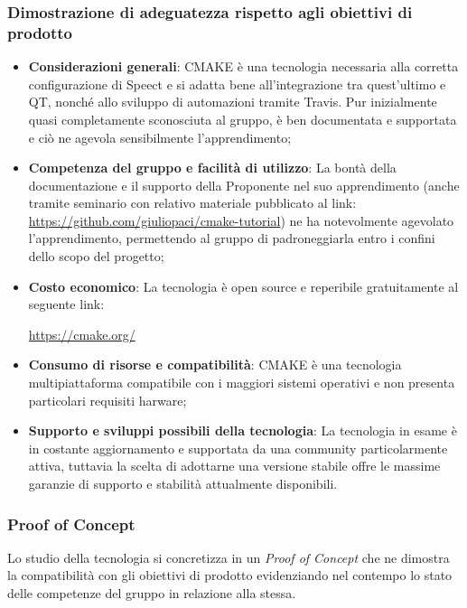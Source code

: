 \documentclass[./../Technology Baseline.tex]{subfiles}
\begin{document}
\subsubsection{Dimostrazione di adeguatezza rispetto agli obiettivi di prodotto}
\begin{itemize}
	\item \textbf{Considerazioni generali}: CMAKE è una tecnologia necessaria alla corretta configurazione di Speect e si adatta bene all'integrazione tra quest'ultimo e QT, nonché allo sviluppo di automazioni tramite Travis. Pur inizialmente quasi completamente sconosciuta al gruppo, è ben documentata e supportata e ciò ne agevola sensibilmente l'apprendimento;
	\item \textbf{Competenza del gruppo e facilità di utilizzo}: La bontà della documentazione e il supporto della Proponente nel suo apprendimento (anche tramite seminario con relativo materiale pubblicato al link: \url{https://github.com/giuliopaci/cmake-tutorial}) ne ha notevolmente agevolato l'apprendimento, permettendo al gruppo di padroneggiarla entro i confini dello scopo del progetto;
	
	\item \textbf{Costo economico}: La tecnologia è open source e reperibile gratuitamente al seguente link:
	\begin{center}
		\url{https://cmake.org/}
	\end{center}

	\item \textbf{Consumo di risorse e compatibilità}: CMAKE è una tecnologia multipiattaforma compatibile con i maggiori sistemi operativi e non presenta particolari requisiti harware;
	
	\item \textbf{Supporto e sviluppi possibili della tecnologia}: La tecnologia in esame è in costante aggiornamento e supportata da una community particolarmente attiva, tuttavia la scelta di adottarne una versione stabile offre le massime garanzie di supporto e stabilità attualmente disponibili.
\end{itemize}

\subsubsection{Proof of Concept}
Lo studio della tecnologia si concretizza in un \textit{Proof of Concept} che ne dimostra la compatibilità con gli obiettivi di prodotto evidenziando nel contempo lo stato delle competenze del gruppo in relazione alla stessa.
\end{document}
